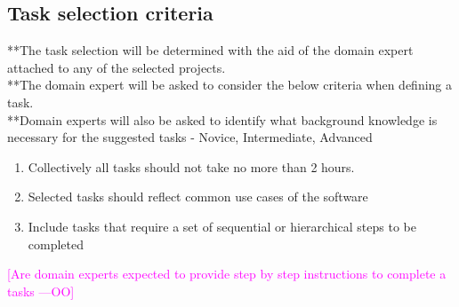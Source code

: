 \documentclass[letterpaper,cleveref]{lipics-v2019}
\newcommand{\authornote}[3]{\textcolor{#1}{[#3 ---#2]}}
\newcommand{\authornote}[3]{}
\newcommand{\oo}[1]{\authornote{magenta}{OO}{#1}} %
\theoremstyle{definition}
\begin{document}
\subsection{Task selection criteria}
**The task selection will be determined with the aid of the domain expert attached to any of the selected projects.\\ 
**The domain expert will be asked to consider the below criteria when defining a task. \\
**Domain experts will also be asked to identify what background knowledge is necessary for the suggested tasks - Novice, Intermediate, Advanced
\begin {enumerate}
\item Collectively all tasks should not take no more than 2 hours.
\item Selected tasks should reflect common use cases of  the software
\item Include tasks that require a set of sequential or hierarchical steps to be completed 

\end {enumerate} 
\oo   {Are domain experts expected to provide step by step instructions to complete a tasks}
\end{document}

